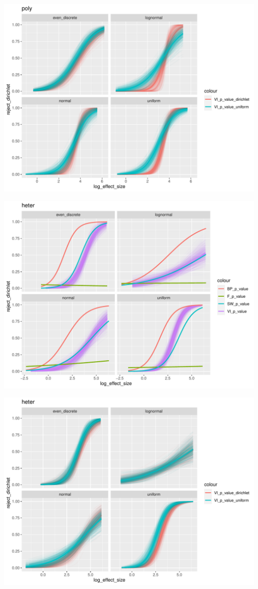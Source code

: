 \documentclass[]{interact}
\theoremstyle{plain}%
\theoremstyle{definition}
\theoremstyle{remark}
\begin{document}
\includegraphics[width=1\linewidth]{paper_comparison_files/figure-latex/unnamed-chunk-8-1}

\includegraphics[width=1\linewidth]{paper_comparison_files/figure-latex/unnamed-chunk-9-1}

\includegraphics[width=1\linewidth]{paper_comparison_files/figure-latex/unnamed-chunk-10-1}
\end{document}
